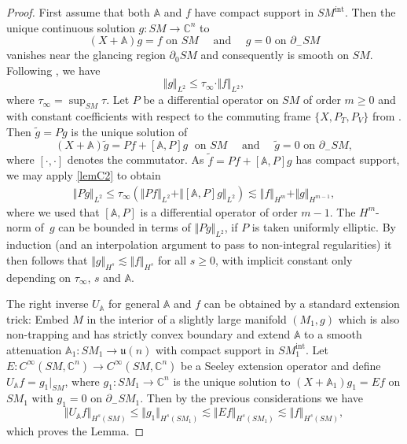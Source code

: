 \documentclass[JEP,XML,SOM,Unicode,published]{cedram}
\theoremstyle{plain}
\theoremstyle{definition}
\newcommand{\A}{\mathbb{A}}
\newcommand{\C}{\mathbb{C}}
\renewcommand{\u}{\mathfrak{u}}
\newcommand{\interior}{\mathrm{int}}
\newcommand{\1}{{\bf 1}}
\begin{document}
\begin{proof} First assume that both $\A$ and $f$ have compact support in $SM^{\interior}$. Then the unique continuous solution $g:SM\to \C^{n}$ to
\begin{equation*}
(X+ \A)g = f \text{ on } SM\quad \text{ and } \quad g = 0 \text{ on } \partial_-SM
\end{equation*}
vanishes near the glancing region $\partial_0SM$ and consequently is smooth on $SM$.
Following \cite[Lem.\,5.12]{MNP19}, we have
\begin{equation} \label{lemC2}
\Vert g \Vert_{L^2} \le \tau_\infty \cdot \Vert f \Vert_{L^2},
\end{equation}
where $\tau_\infty = \sup_{SM} \tau$.
Let $P$ be a differential operator on $SM$ of order $m\ge 0$ and with constant coefficients with respect to the commuting frame $\{X,P_T,P_V\}$ from \cite[Lem.\,5.1]{MNP19}. Then $\tilde g= Pg$ is the unique solution of
\begin{equation*}
(X+\A) \tilde g = Pf + [\A,P]g\; \text{ on } SM\quad \text{ and } \quad \tilde g = 0 \text{ on } \partial_-SM,
\end{equation*}
where $[\cdot,\cdot]$ denotes the commutator. As $\tilde f = Pf + [\A,P]g$ has compact support, we may apply \eqref{lemC2} to obtain
\begin{equation*}
\begin{split}
\Vert P g \Vert_{L^2} \le \tau_\infty\left(\Vert Pf \Vert_{L^2} + \Vert [\A,P]g \Vert_{L^2}\right)
\lesssim \Vert f \Vert_{H^m} + \Vert g \Vert_{H^{m-1}},
\end{split}
\end{equation*}
where we used that $[\A,P]$ is a differential operator of order $m-1$. The $H^m$-norm of~$g$ can be bounded in terms of $\Vert P g \Vert_{L^2}$, if $P$ is taken uniformly elliptic. By induction (and an interpolation argument to pass to non-integral regularities) it then follows that
$
\Vert g \Vert_{H^s} \lesssim \Vert f \Vert_{H^s}
$ for all $s\ge 0$, with implicit constant only depending on $\tau_\infty$, $s$ and $\A$.

The right inverse $U_\A$ for general $\A$ and $f$ can be obtained by a standard extension trick: Embed $M$ in the interior of a slightly large manifold $(M_1,g)$ which is also non-trapping and has strictly convex boundary and extend $\A$ to a smooth attenuation $\A_1:SM_1\to \u(n)$ with compact support in $SM_1^{\interior}$.
Let $E:C^\infty(SM,\C^{n})\to C^\infty(SM,\C^{n})$ be a Seeley extension operator and define $U_\A f = g_1 \vert_{SM}$, where $g_1:SM_1\to \C^{n}$ is the unique solution to $(X + \A_1) g_1 = E f $ on $SM_1$ with $g_1 = 0 $ on $\partial_-SM_1$. Then by the previous considerations we have
\begin{equation*}
\Vert U_\A f \Vert_{H^s(SM)} \le \Vert g_1 \Vert_{H^s(SM_1)} \lesssim \Vert E f \Vert_{H^s(SM_1)} \lesssim \Vert f \Vert_{H^s(SM)},
\end{equation*}
which proves the Lemma.
\end{proof}
\end{document}
